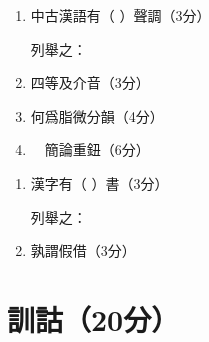 \documentclass[12pt,a4paper]{article}
\begin{document}
\vspace{1em}

\begin{enumerate}[leftmargin=*, label=\textbf{\arabic*.}, start=6]
    \item 中古漢語有（ ）聲調（3分）
    
    列舉之：
    \item 四等及介音（3分）
    
    \item 何爲脂微分韻（4分）
    
    \vspace{8em}
    
    \item　簡論重鈕（6分）
    
    \vspace{10em}
\end{enumerate}
\vspace{1em}

\begin{enumerate}[leftmargin=*, label=\textbf{\arabic*.}, start=10]

    
\section{文字（35分）}

    \item 漢字有（ ）書（3分）
    
  列舉之：  
    \item 孰謂假借（3分）
 
\end{enumerate}


\section{訓詁（20分）}
\end{document}
